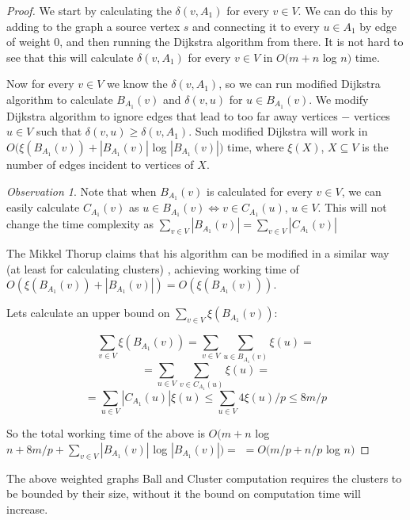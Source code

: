 \documentclass[shortabstract, lic, english]{iithesis}
\theoremstyle{definition} \newtheorem{definition}{Definition}[chapter]
\theoremstyle{remark} \newtheorem{remark}[definition]{Observation}
\theoremstyle{plain} \newtheorem{theorem}[definition]{Theorem}
\theoremstyle{plain} \newtheorem{lemma}[definition]{Lemma}
\theoremstyle{plain} \newtheorem{conjecture}[definition]{Conjecture}
\begin{document}
\begin{proof}
    We start by calculating the $\delta(v, A_1)$ for every $v \in V$. We can do this by adding to the graph a source vertex $s$ and connecting it to every $u \in A_1$ by edge of weight $0$, and then
    running the Dijkstra algorithm from there. It is not hard to see that this will calculate $\delta(v, A_1)$ for every $v \in V$ in $O(m + n $ log $n)$ time.
    
    Now for every $v \in V$ we know the $\delta(v, A_1)$, so
    we can run modified Dijkstra algorithm to calculate $B_{A_1}(v)$ and $\delta(v, u)$ for $u \in B_{A_1}(v)$.
    We modify Dijkstra algorithm to ignore edges that lead to too far away vertices $-$ vertices $u \in V$ such that $\delta(v,u) \geq \delta(v, A_1)$.
    Such modified Dijkstra will work in $O(\xi(B_{A_1}(v)) + |B_{A_1}(v)| $ log $|B_{A_1}(v)|)$ time, where $\xi(X)$, $X \subseteq V$
    is the number of edges incident to vertices of $X$.
    
    \begin{remark} \label{ballClusterEquivalence}
    Note that when $B_{A_1}(v)$ is calculated for every $v \in V$, we can easily calculate $C_{A_1}(v)$ as $u \in B_{A_1}(v) \iff v \in C_{A_1}(u)$, $u \in V$.
    This will not change the time complexity as $\sum_{v \in V}|B_{A_1}(v)| = \sum_{v \in V}|C_{A_1}(v)|$
    \end{remark}

    The Mikkel Thorup claims that his algorithm can be modified in a similar way (at least for calculating clusters) \cite{a0OraclesBasic},
    achieving working time of $O(\xi(B_{A_1}(v)) + |B_{A_1}(v)|) = O(\xi(B_{A_1}(v)))$.

    Lets calculate an upper bound on $\sum_{v \in V} \xi(B_{A_1}(v))$:

    $$\sum_{v \in V} \xi(B_{A_1}(v)) = \sum_{v \in V} \sum_{u \in B_{A_1}(v)} \xi(u) =$$
    $$= \sum_{u \in V} \sum_{v \in C_{A_1}(u)} \xi(u) =$$
    $$= \sum_{u \in V} |C_{A_1}(u)|\xi(u) \leq \sum_{u \in V} 4\xi(u)/p \leq 8m/p $$ 

    So the total working time of the above is 
    \newline
    $O(m + n $ log $ n + 8m/p + \sum_{v \in V}|B_{A_1}(v)| $ log $|B_{A_1}(v)|) =$
    \newline
    $=O(m/p + n/p $ log $n) $

\end{proof}

The above weighted graphs Ball and Cluster computation requires the clusters to be bounded by their size, without it the bound on computation time will increase.
\end{document}
